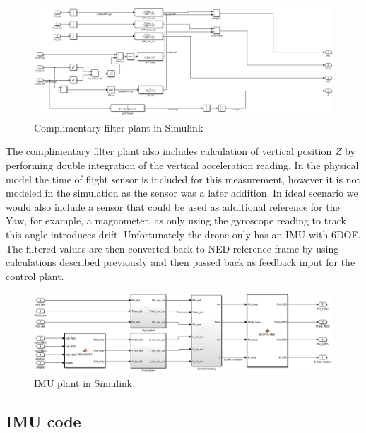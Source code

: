 \begin{figure}[H]
    \begin{center}
    \includegraphics[scale = 0.55]{pictures/IMU/Complimentary_filter_plant.png}
    \end{center}
    \caption{Complimentary filter plant in Simulink}
    \label{fig:my_label}
\end{figure}

The complimentary filter plant also includes calculation of vertical position $Z$ by performing double integration of the vertical acceleration reading. In the physical model the time of flight sensor is included for this measurement, however it is not modeled in the simulation as the sensor was a later addition. In ideal scenario we would also include a sensor that could be used as additional reference for the Yaw, for example, a magnometer, as only using the gyroscope reading to track this angle introduces drift. Unfortunately the drone only has an IMU with 6DOF. 
The filtered values are then converted back to NED reference frame by using calculations described previously and then passed back as feedback input for the control plant.

\begin{figure}[H]
    \begin{center}
    \includegraphics[scale = 0.55]{pictures/IMU/IMU_plant.png}
    \end{center}
    \caption{IMU plant in Simulink}
    \label{fig:my_label}
\end{figure}

\subsection{IMU code}

